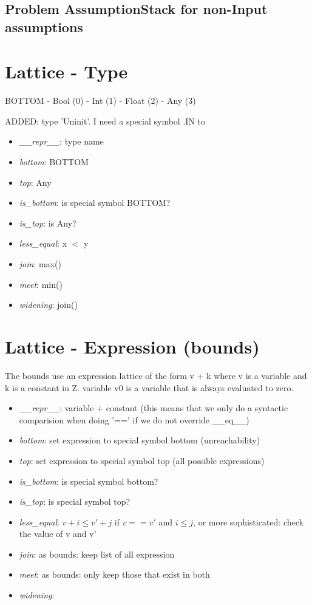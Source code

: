 \documentclass[11pt]{article}
\begin{document}
\subsection{Problem AssumptionStack for non-Input assumptions}



\section{Lattice - Type}

BOTTOM - Bool (0) - Int (1) - Float (2) - Any (3)

ADDED: type 'Uninit'. I need a special symbol .IN to 

\begin{itemize}
\item \textit{\_\_repr\_\_}: type name
\item \textit{bottom}: BOTTOM
\item \textit{top}: Any
\item \textit{is\_bottom}: is special symbol BOTTOM?
\item \textit{is\_top}: is Any?
\item \textit{less\_equal}: x $<$ y
\item \textit{join}: max()
\item \textit{meet}: min()
\item \textit{widening}: join()
\end{itemize}

\section{Lattice - Expression (bounds)}

The bounds use an expression lattice of the form v + k where v is a variable and k is a constant in Z. variable v0 is a variable that is always evaluated to zero.

\begin{itemize}
\item \textit{\_\_repr\_\_}: variable + constant (this means that we only do a syntactic comparision when doing '==' if we do not override \_\_eq\_\_)
\item \textit{bottom}: set expression to special symbol bottom (unreachability)
\item \textit{top}: set expression to special symbol top (all possible expressions)
\item \textit{is\_bottom}: is special symbol bottom?
\item \textit{is\_top}: is special symbol top?
\item \textit{less\_equal}: $v + i \leq v' + j$ if $v == v'$ and $i \leq j$, or more sophisticated: check the value of v and v'
\item \textit{join}: as bounds: keep list of all expression
\item \textit{meet}: as bounds: only keep those that exist in both
\item \textit{widening}: 
\end{itemize}
\end{document}

